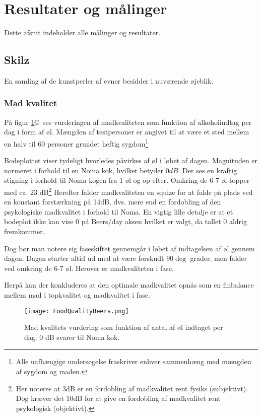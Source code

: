\section{Resultater og målinger}
Dette afsnit indeholder alle målinger og resultater. 

\subsection{Skilz}
En samling af de kunstperler af evner \HM besidder i nuværende øjeblik.

\subsubsection{Mad kvalitet}
På figur \ref{fig:FoodBeer}\copyright \, ses vurderingen af madkvaliteten som funktion af alkoholindtag per dag i form af øl. Mængden af testpersoner er angivet til at være et sted mellem en halv til 60 personer grundet heftig sygdom\footnote{Alle uafhængige undersøgelse fraskriver enhver sammenhæng med mængden af sygdom og maden.} 

Bodeplottet viser tydeligt hvorledes \HM påvirkes af øl i løbet af dagen. Magnituden er normeret i forhold til en Noma kok, hvilket betyder $0dB$. Der ses en kraftig stigning i forhold til Noma kogen fra 1 øl og op efter. Omkring de 6-7 øl topper \HM med ca. 23 dB\footnote{Her noteres at 3dB er en fordobling af madkvalitet rent fysiks (subjektivt). Dog kræver det 10dB for at give en fordobling af madkvalitet rent psykologisk (objektivt).} Herefter falder madkvaliteten en squize for at falde på plads ved en konstant forstærkning på 14dB, dvs. mere end en fordobling af den psykologiske madkvalitet i forhold til Noma.
En vigtig lille detalje er at et bodeplot ikke kan vise 0 på Beers/day aksen hvilket er valgt, da tallet 0 aldrig fremkommer. 

Dog bør man notere sig faseskiftet \HM gennemgår i løbet af indtagelsen af øl gennem dagen. Dagen starter altid ud med at være forskudt $90 \deg$ grader, men falder ved omkring de 6-7 øl. Herover er madkvaliteten i fase.

Herpå kan der konkluderes at den optimale madkvalitet opnås som en finbalance mellem mad i topkvalitet og madkvalitet i fase.  

\begin{figure}[h!]
\centering
\texttt{[image: FoodQualityBeers.png]}
\caption{Mad kvalitets vurdering som funktion af antal af øl indtaget per dag. 0 dB svarer til Noma kok.}
\label{fig:FoodBeer}
\end{figure}


